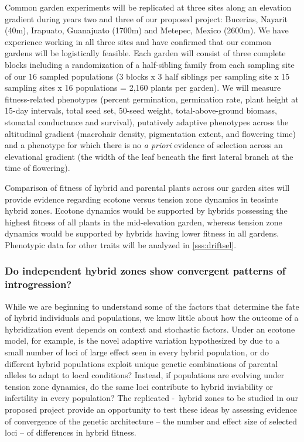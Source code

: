 Common garden experiments will be replicated at three sites along an elevation gradient during years two and three of our proposed project: Bucerias, Nayarit (40m), Irapuato, Guanajuato (1700m) and Metepec, Mexico (2600m).
We have experience working in all three sites and have confirmed that our common gardens will be logistically feasible.
Each garden will consist of three complete blocks including a randomization of a half-sibling family from each sampling site of our 16 sampled populations (3 blocks x 3 half siblings per sampling site x 15 sampling sites x 16 populations = 2,160 plants per garden).  
We will measure fitness-related phenotypes (percent germination, germination rate, plant height at 15-day intervals, total seed set, 50-seed weight, total-above-ground biomass, stomatal conductance and survival), putatively adaptive phenotypes across the altitudinal gradient (macrohair density, pigmentation extent, and flowering time) and a phenotype for which there is no \emph{a priori} evidence of selection across an elevational gradient (the width of the leaf beneath the first lateral branch at the time of flowering).  

Comparison of fitness of hybrid and parental plants across our garden sites will provide evidence regarding ecotone versus tension zone dynamics in teosinte hybrid zones.  
Ecotone dynamics would be supported by hybrids possessing the highest fitness of all plants in the mid-elevation garden, whereas tension zone dynamics would be supported by hybrids having lower fitness in all gardens.
Phenotypic data for other traits will be analyzed in \ref{sss:driftsel}.

\subsubsection{Do independent hybrid zones show convergent patterns of introgression?}
\label{sss:genomescan}

While we are beginning to understand some of the factors that determine the fate of hybrid individuals and populations, we know little about how the outcome of a hybridization event depends on context and stochastic factors. 
Under an ecotone model, for example, is the novel adaptive variation hypothesized by \citet{Anderson1954} due to a small number of loci of large effect seen in every hybrid population, or do different hybrid populations exploit unique genetic combinations of parental alleles to adapt to local conditions?
Instead, if populations are evolving under tension zone dynamics, do the same loci contribute to hybrid inviability or infertility in every population?
The replicated \zm-\zp\ hybrid zones to be studied in our proposed project provide an opportunity to test these ideas by assessing evidence of convergence of the genetic architecture -- the number and effect size of selected loci -- of differences in hybrid fitness.

